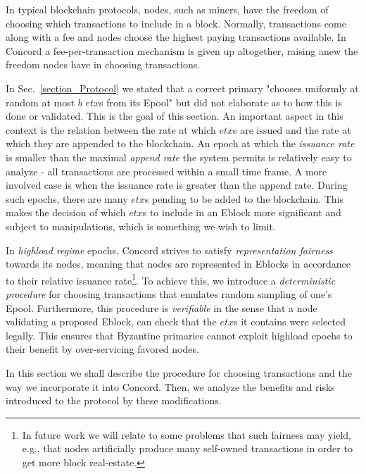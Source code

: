 In typical blockchain protocols, nodes, such as miners, have the freedom of choosing which transactions to include in a block. Normally, transactions come along with a fee and nodes choose the highest paying transactions available. 
In Concord a fee-per-transaction mechanism is given up altogether, 
raising anew the freedom nodes have in choosing transactions.

In Sec.~\ref{section_Protocol} we stated that a correct primary "chooses uniformly at random at most $b$ $etx$s from its Epool" but did not elaborate as to how this is done or validated. This is the goal of this section. An important aspect in this context is the relation between the rate at which $etx$s are issued and the rate at which they are appended to the blockchain. An epoch at which the \emph{issuance rate} is smaller than the maximal \emph{append rate} the system permits is relatively easy to analyze - all transactions are processed within a small time frame. A more involved case is when the issuance rate is greater than the append rate. During such epochs, there are many $etx$s pending to be added to the blockchain. This makes the decision of which $etx$s to include in an Eblock more significant and subject to manipulations, which is something we wish to limit.

In \emph{highload regime} epochs, Concord strives to satisfy \emph{representation fairness} towards its nodes, meaning that nodes are represented in Eblocks in accordance to their relative issuance rate\footnote{In future work we will relate to some problems that such fairness may yield, e.g., that nodes artificially produce many self-owned transactions in order to get more block real-estate.}. To achieve this, we introduce a \emph{deterministic procedure} for choosing transactions that emulates random sampling of one's Epool. Furthermore, this procedure is \emph{verifiable} in the sense that a node validating a proposed Eblock, can check that the $etx$s it contains were selected legally. This ensures that Byzantine primaries cannot exploit highload epochs to their benefit by over-servicing favored nodes.

In this section we shall describe the procedure for choosing transactions and the way we incorporate it into Concord. Then, we analyze the benefits and risks introduced to the protocol by these modifications.

